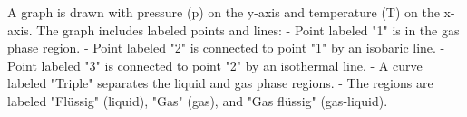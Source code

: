 A graph is drawn with pressure (p) on the y-axis and temperature (T) on the x-axis. The graph includes labeled points and lines:  
- Point labeled "1" is in the gas phase region.  
- Point labeled "2" is connected to point "1" by an isobaric line.  
- Point labeled "3" is connected to point "2" by an isothermal line.  
- A curve labeled "Triple" separates the liquid and gas phase regions.  
- The regions are labeled "Flüssig" (liquid), "Gas" (gas), and "Gas flüssig" (gas-liquid).